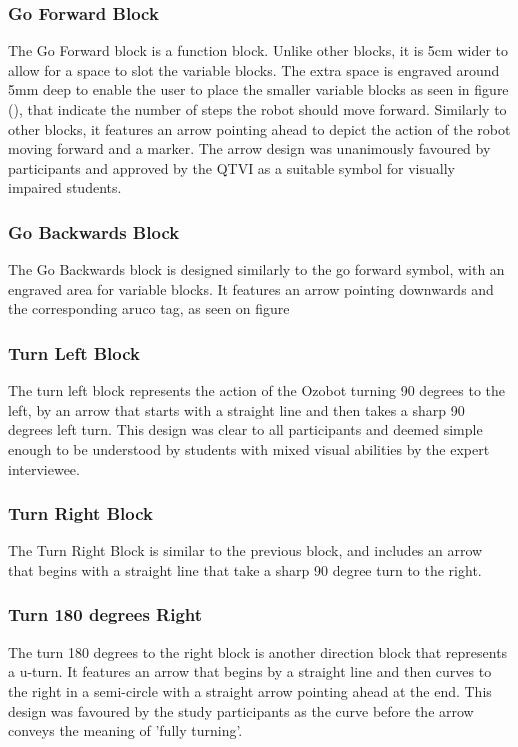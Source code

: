 \documentclass[oneside,%
                    author={Malak Hajji},
                    degree={BSc},
                    title={Designing An Accessible Computational Toolkit For Students},
                  subtitle={With Mixed Visual Abilities}]{dissertation}
\begin{document}
\subsubsection{Go Forward Block}
The Go Forward block is a function block. Unlike other blocks, it is 5cm wider to allow for a space to slot the variable blocks. The extra space is engraved around 5mm deep to enable the user to place the smaller variable blocks as seen in figure (), that indicate the number of steps the robot should move forward. Similarly to other blocks, it features an arrow pointing ahead to depict the action of the robot moving forward and a marker. The arrow design was unanimously favoured by participants and approved by the QTVI as a suitable symbol for visually impaired students. 
\subsubsection{Go Backwards Block}
The Go Backwards block is designed similarly to the go forward symbol, with an engraved area for variable blocks. It features an arrow pointing downwards and the corresponding aruco tag, as seen on figure 
\subsubsection{Turn Left Block}
The turn left block represents the action of the Ozobot turning 90 degrees to the left, by an arrow that starts with a straight line and then takes a sharp 90 degrees left turn. This design was clear to all participants and deemed simple enough to be understood by students with mixed visual abilities by the expert interviewee.
\subsubsection{Turn Right Block}
The Turn Right Block is similar to the previous block, and includes an arrow that begins with a straight line that take a sharp 90 degree turn to the right.
\subsubsection{Turn 180 degrees Right}
The turn 180 degrees to the right block is another direction block that represents a u-turn. It features an arrow that begins by a straight line and then curves to the right in a semi-circle with a straight arrow pointing ahead at the end. This design was favoured by the study  participants as the curve before the arrow conveys the meaning of 'fully turning'. 
\end{document}

